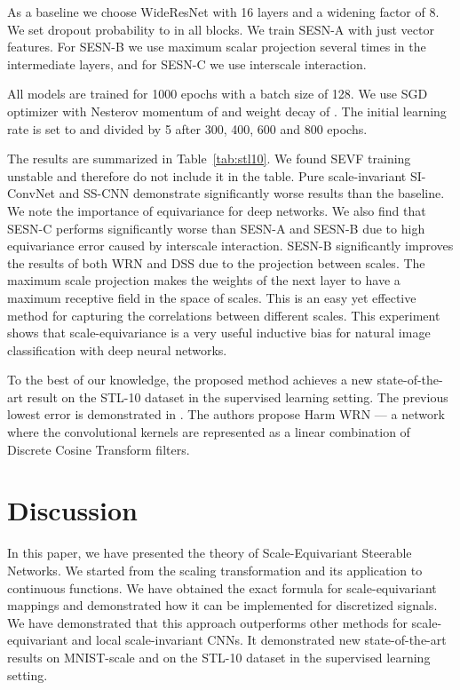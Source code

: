 \documentclass{article} \usepackage{multirow}
\def\Tabref#1{Table~\ref{#1}}
\begin{document}
As a baseline we choose WideResNet \citet{zagoruyko2016wide} with 16 layers and a widening factor of 8.
We set dropout probability to  in all blocks. We train SESN-A with just vector features. 
For SESN-B we use maximum scalar projection several times in the intermediate layers, 
and for SESN-C we use interscale interaction. 

All models are trained for 1000 epochs with a batch size of 128. We use SGD optimizer
with Nesterov momentum of  and weight decay of . The initial learning rate is set to 
and divided by 5 after 300, 400, 600 and 800 epochs. 

The results are summarized in \Tabref{tab:stl10}. We found SEVF training unstable and therefore do not include it in the table.
Pure scale-invariant SI-ConvNet and SS-CNN demonstrate significantly worse results than the baseline. 
We note the importance of equivariance for deep networks.
We also find that SESN-C performs significantly worse than SESN-A and SESN-B due to high equivariance error
caused by interscale interaction. SESN-B significantly improves the results of both WRN and DSS due to the projection between scales. 
The maximum scale projection makes the weights of the next layer to have a maximum receptive field in the space of scales. This is an easy yet effective method for capturing the correlations between different scales.
This experiment shows that scale-equivariance is a very useful inductive bias for natural 
image classification with deep neural networks.

To the best of our knowledge, the proposed method achieves a new state-of-the-art result on the STL-10 dataset in the 
supervised learning setting. The previous lowest error is demonstrated in \citet{ulicny2019harmonic}. 
The authors propose Harm WRN --- a network where the convolutional kernels are represented as a linear combination of 
Discrete Cosine Transform filters.
 \section{Discussion}
\label{sec:discussions}
In this paper, we have presented the theory of Scale-Equivariant Steerable Networks.
We started from the scaling transformation and its application to continuous functions.
We have obtained the exact formula for scale-equivariant mappings and demonstrated how 
it can be implemented for discretized signals. 
We have demonstrated that this approach outperforms other 
methods for scale-equivariant and local scale-invariant CNNs. 
It demonstrated new state-of-the-art 
results on MNIST-scale and on the STL-10 
dataset in the supervised learning setting.
\end{document}
